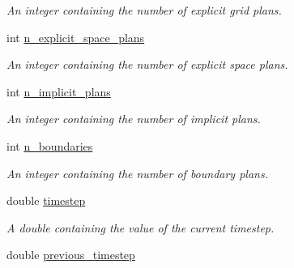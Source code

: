 \begin{DoxyCompactItemize}
\begin{DoxyCompactList}\small\item\em An integer containing the number of explicit grid plans. \end{DoxyCompactList}\item 
\hypertarget{classelement_1_1element_a096ac4c9d76df9c75b1e1976f732c395}{int \hyperlink{classelement_1_1element_a096ac4c9d76df9c75b1e1976f732c395}{n\-\_\-explicit\-\_\-space\-\_\-plans}}\label{classelement_1_1element_a096ac4c9d76df9c75b1e1976f732c395}

\begin{DoxyCompactList}\small\item\em An integer containing the number of explicit space plans. \end{DoxyCompactList}\item 
\hypertarget{classelement_1_1element_a60ebcd4f5a015c7e1fed56e1ec4c770d}{int \hyperlink{classelement_1_1element_a60ebcd4f5a015c7e1fed56e1ec4c770d}{n\-\_\-implicit\-\_\-plans}}\label{classelement_1_1element_a60ebcd4f5a015c7e1fed56e1ec4c770d}

\begin{DoxyCompactList}\small\item\em An integer containing the number of implicit plans. \end{DoxyCompactList}\item 
\hypertarget{classelement_1_1element_ab4595ec50129256c83e6cc1e37fb2f46}{int \hyperlink{classelement_1_1element_ab4595ec50129256c83e6cc1e37fb2f46}{n\-\_\-boundaries}}\label{classelement_1_1element_ab4595ec50129256c83e6cc1e37fb2f46}

\begin{DoxyCompactList}\small\item\em An integer containing the number of boundary plans. \end{DoxyCompactList}\item 
\hypertarget{classelement_1_1element_adbb8ab346ea8e82b0f4ab430a8758f06}{double \hyperlink{classelement_1_1element_adbb8ab346ea8e82b0f4ab430a8758f06}{timestep}}\label{classelement_1_1element_adbb8ab346ea8e82b0f4ab430a8758f06}

\begin{DoxyCompactList}\small\item\em A double containing the value of the current timestep. \end{DoxyCompactList}\item 
\hypertarget{classelement_1_1element_a1d3dab98f21d0867275fc1a0a12e8519}{double \hyperlink{classelement_1_1element_a1d3dab98f21d0867275fc1a0a12e8519}{previous\-\_\-timestep}}\label{classelement_1_1element_a1d3dab98f21d0867275fc1a0a12e8519}


\end{DoxyCompactItemize}
